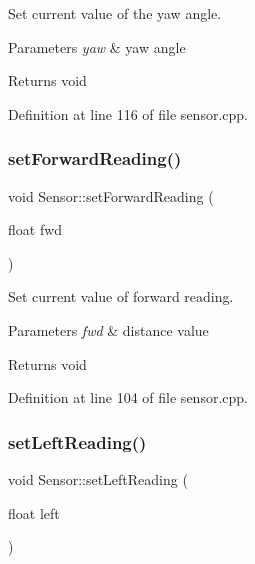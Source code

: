 Set current value of the yaw angle. 


\begin{DoxyParams}{Parameters}
{\em yaw} & yaw angle \\
\hline
\end{DoxyParams}
\begin{DoxyReturn}{Returns}
void 
\end{DoxyReturn}


Definition at line 116 of file sensor.\+cpp.

\mbox{\label{class_sensor_ae406fca85ea14092ddc0857cf1c00f13}} 
\subsubsection{\texorpdfstring{set\+Forward\+Reading()}{setForwardReading()}}
{\footnotesize\ttfamily void Sensor\+::set\+Forward\+Reading (\begin{DoxyParamCaption}\item[{float}]{fwd }\end{DoxyParamCaption})}



Set current value of forward reading. 


\begin{DoxyParams}{Parameters}
{\em fwd} & distance value \\
\hline
\end{DoxyParams}
\begin{DoxyReturn}{Returns}
void 
\end{DoxyReturn}


Definition at line 104 of file sensor.\+cpp.

\mbox{\label{class_sensor_a510ede2de9130fb4dad6306606524f55}} 
\subsubsection{\texorpdfstring{set\+Left\+Reading()}{setLeftReading()}}
{\footnotesize\ttfamily void Sensor\+::set\+Left\+Reading (\begin{DoxyParamCaption}\item[{float}]{left }\end{DoxyParamCaption})}



